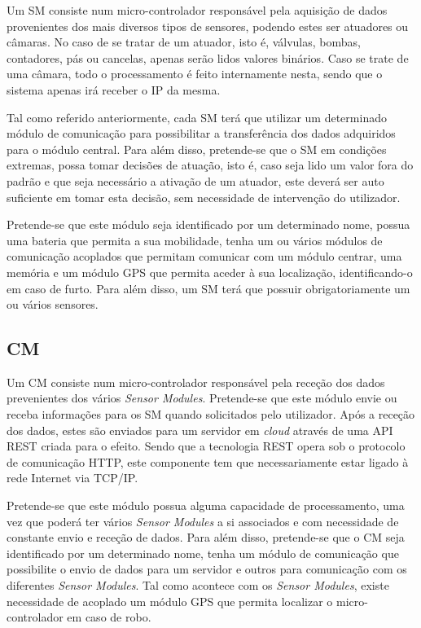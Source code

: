 Um \acl{SM} consiste num micro-controlador responsável pela aquisição de dados provenientes dos mais diversos tipos de sensores, podendo estes ser atuadores ou câmaras. No caso de se tratar de um atuador, isto é, válvulas, bombas, contadores, pás ou cancelas, apenas serão lidos valores binários. Caso se trate de uma câmara, todo o processamento é feito internamente nesta, sendo que o sistema apenas irá receber o IP da mesma. 


Tal como referido anteriormente, cada \acl{SM} terá que utilizar um determinado módulo de comunicação para possibilitar a transferência dos dados adquiridos para o módulo central. Para além disso, pretende-se que o \acl{SM} em condições extremas, possa tomar decisões de atuação, isto é, caso seja lido um valor fora do padrão e que seja necessário a ativação de um atuador, este deverá ser auto suficiente em tomar esta decisão, sem necessidade de intervenção do utilizador. 

Pretende-se que este módulo seja identificado por um determinado nome, possua uma bateria que permita a sua mobilidade, tenha um ou vários módulos de comunicação acoplados que permitam comunicar com um módulo centrar, uma memória e um módulo \ac{GPS} que permita aceder à sua localização, identificando-o em caso de furto. Para além disso, um \acl{SM} terá que possuir obrigatoriamente um ou vários sensores.








\subsection{\acl{CM}}



Um \acl{CM} consiste num micro-controlador responsável pela receção dos dados prevenientes dos vários \textit{Sensor Modules}. Pretende-se que este módulo envie ou receba informações para os \acl{SM} quando solicitados pelo utilizador. Após a receção dos dados, estes são enviados para um servidor em \textit{cloud} através de uma \ac{API} \ac{REST} criada para o efeito. Sendo que a tecnologia \ac{REST} opera sob o protocolo de comunicação \ac{HTTP}, este componente tem que necessariamente estar ligado à rede Internet via \ac{TCP}/\ac{IP}. 

Pretende-se que este módulo possua alguma capacidade de processamento, uma vez que poderá ter vários \textit{Sensor Modules} a si associados e com necessidade de constante envio e receção de dados.  Para além disso, pretende-se que o \acl{CM} seja identificado por um determinado nome, tenha um  módulo de comunicação que possibilite o envio de dados para um servidor e outros para comunicação com os diferentes \textit{Sensor Modules}. Tal como acontece com os \textit{Sensor Modules}, existe necessidade de acoplado um módulo \ac{GPS} que permita localizar o micro-controlador em caso de robo.
 





